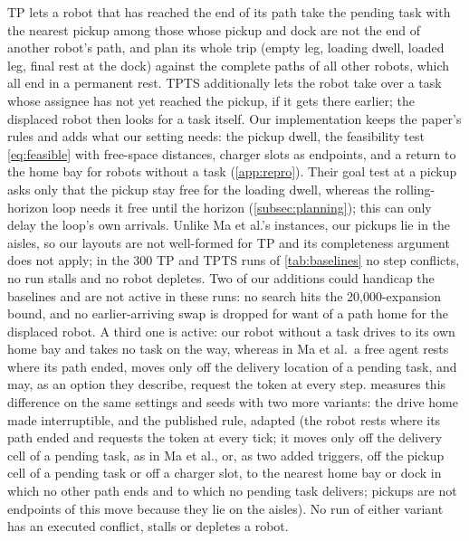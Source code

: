 TP \citep{ma2017lifelong} lets a robot that has reached the end of its path
take the pending task with the nearest pickup among those whose pickup and
dock are not the end of another robot's path, and plan its whole trip
(empty leg, loading dwell, loaded leg, final rest at the dock) against the
complete paths of all other robots, which all end in a permanent rest.
TPTS additionally lets the robot take over a task whose assignee has not yet
reached the pickup, if it gets there earlier; the displaced robot then
looks for a task itself. Our implementation keeps the paper's rules and adds
what our setting needs: the pickup dwell, the feasibility test
\cref{eq:feasible} with free-space distances, charger slots as endpoints, and
a return to the home bay for robots without a task (\cref{app:repro}). Their
goal test at a pickup asks only that the pickup stay free for the loading dwell,
whereas the rolling-horizon loop needs it free until the horizon
(\cref{subsec:planning}); this can only delay the loop's own arrivals.
Unlike Ma et al.'s instances, our pickups lie in the aisles, so our layouts
are not well-formed for TP and its completeness argument does not apply; in
the 300 TP and TPTS runs of \cref{tab:baselines} no step conflicts, no run
stalls and no robot depletes. Two of our additions could handicap the
baselines and are not active in these runs: no search hits the
20{,}000-expansion bound, and no earlier-arriving swap is dropped for want
of a path home for the displaced robot. A third one is active: our robot
without a task drives to its own home bay and takes no task on the way,
whereas in Ma et al.\ a free agent rests where its path ended, moves only
off the delivery location of a pending task, and may, as an option they
describe, request the token at every step.  measures this difference on the same settings
and seeds with two more variants: the drive home made interruptible, and the
published rule, adapted (the robot rests where its path ended and requests the
token at every tick; it moves only off the delivery cell of a pending task, as
in Ma et al., or, as two added triggers, off the pickup cell of a pending task
or off a charger slot, to the nearest home bay or dock in which no other path
ends and to which no pending task delivers; pickups are not endpoints of this
move because they lie on the aisles). No run of either
variant has an executed conflict, stalls or depletes a robot.


